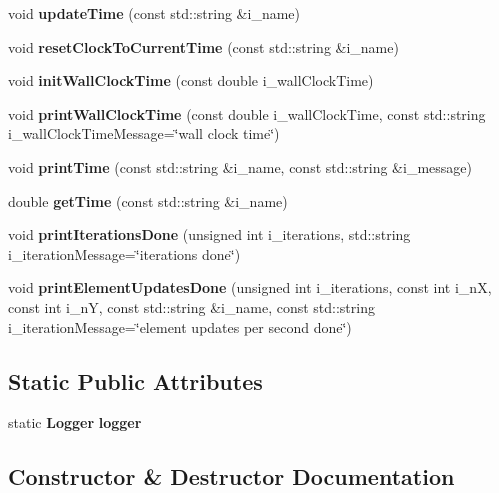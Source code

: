 \begin{DoxyCompactItemize}
\item 
void {\bf update\-Time} (const std\-::string \&i\-\_\-name)
\item 
void {\bf reset\-Clock\-To\-Current\-Time} (const std\-::string \&i\-\_\-name)
\item 
void {\bf init\-Wall\-Clock\-Time} (const double i\-\_\-wall\-Clock\-Time)
\item 
void {\bf print\-Wall\-Clock\-Time} (const double i\-\_\-wall\-Clock\-Time, const std\-::string i\-\_\-wall\-Clock\-Time\-Message=\char`\"{}wall clock time\char`\"{})
\item 
void {\bf print\-Time} (const std\-::string \&i\-\_\-name, const std\-::string \&i\-\_\-message)
\item 
double {\bf get\-Time} (const std\-::string \&i\-\_\-name)
\item 
void {\bf print\-Iterations\-Done} (unsigned int i\-\_\-iterations, std\-::string i\-\_\-iteration\-Message=\char`\"{}iterations done\char`\"{})
\item 
void {\bf print\-Element\-Updates\-Done} (unsigned int i\-\_\-iterations, const int i\-\_\-n\-X, const int i\-\_\-n\-Y, const std\-::string \&i\-\_\-name, const std\-::string i\-\_\-iteration\-Message=\char`\"{}element updates per second done\char`\"{})
\end{DoxyCompactItemize}
\subsection*{Static Public Attributes}
\begin{DoxyCompactItemize}
\item 
static {\bf Logger} {\bf logger}
\end{DoxyCompactItemize}


\subsection{Constructor \& Destructor Documentation}
